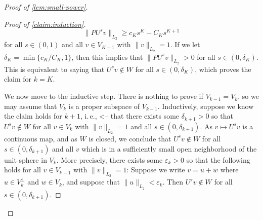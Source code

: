 \documentclass[11pt]{article}
\newcommand{\ie}{i.\,e.}
\theoremstyle{plain}
\numberwithin{equation}{section}
\theoremstyle{definition}
\newcommand{\norm}[1]{\lVert#1\rVert}
\begin{document}
\begin{proof}[Proof of \cref{lem:small-power}]
\begin{proof}[Proof of \cref{claim:induction}]
         \[
            \norm{PU^s v}_{L_2} \geq c_K s^K - C_K s^{K+1}
        \]
        for all $s \in (0,1)$ and all $v \in V_{K-1}$ with $\norm v_{L_2}=1$. If we let $\delta_K=\min\{c_K/C_K,1\}$, then this implies that $\norm{PU^sv}_{L_2}>0$ for all $s \in (0,\delta_K)$. This is equivalent to saying that $U^s v \notin W$ for all $s \in (0,\delta_K)$, which proves the claim for $k=K$.

        We now move to the inductive step. There is nothing to prove if $V_{k-1}=V_k$, so we may assume that $V_k$ is a proper subspace of $V_{k-1}$. Inductively, suppose we know the claim holds for $k+1$,
%
\ie,      <--
that there exists some $\delta_{k+1}>0$ so that $U^s v \notin W$ for all $v \in V_k$ with $\norm{v}_{L_2}=1$ and all $s \in (0,\delta_{k+1})$. As $v \mapsto U^s v$ is a continuous map, and as $W$ is closed, we conclude that $U^s v \notin W$ for all $s \in (0,\delta_{k+1})$ and all $v$ which is in a sufficiently small open neighborhood of the unit sphere in $V_k$. More precisely, there exists some $\varepsilon_k>0$ so that the following holds for all $v \in V_{k-1}$ with $\norm v_{L_2}=1$: Suppose we write $v=u+w$ where $u \in V_{k}^\perp$ and $w \in V_{k}$, and suppose that $\norm{u}_{L_2} <\varepsilon_k$. Then $U^s v \notin W$ for all $s \in (0,\delta_{k+1})$.


\end{proof}
\end{proof}
\end{document}
